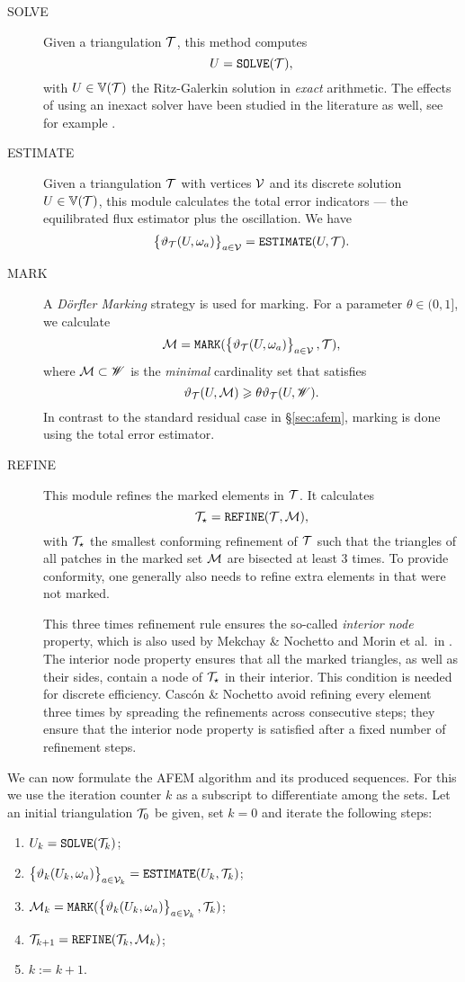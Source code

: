 \documentclass[thesis.tex]{subfiles}
\begin{document}
\begin{description}
  \item[SOLVE]
Given a triangulation $\mathcal{T}$, this method computes
\[
  U = \texttt{SOLVE}(\mathcal{T}),
\]
with $U \in \mathbb{V}(\mathcal{T})$ the  Ritz-Galerkin solution in \emph{exact} arithmetic. The effects of using an inexact solver have
been studied in the literature as well, see for example \cite{carstensen2014axioms}.
\item[ESTIMATE]
  Given a triangulation $\mathcal{T}$ with vertices $\mathcal{V}$ and its discrete solution $U \in \mathbb{V}(\mathcal{T})$, this module 
calculates the total error indicators --- the equilibrated flux estimator plus the oscillation. We have
\[
  \set{\vartheta_{\mathcal{T}}(U, \omega_a)}_{a \in \mathcal{V}} = \texttt{ESTIMATE}(U, \mathcal{T}).
\]
\item[MARK]
A \emph{D\"orfler Marking} strategy \cite{dorfler1996convergent} is used for marking. For a parameter $\theta \in (0,1]$, we calculate
\[
  \mathcal{M} = \texttt{MARK}( \set{\vartheta_{\mathcal{T}}(U, \omega_a)}_{a \in \mathcal{V}}, \mathcal{T}),
\]
where $\mathcal{M} \subset \mathscr{W}$ is the \emph{minimal} cardinality set that satisfies
\[
  \vartheta_{\mathcal{T}}(U,\mathcal{M}) \geqslant \theta \vartheta_{\mathcal{T}}(U, \mathscr{W}).
\]
In contrast to the standard residual case in \S\ref{sec:afem}, marking is done using the total error estimator.
\item[REFINE]
This module refines the marked elements in $\mathcal{T}$. It calculates
\[
  \mathcal{T}_\star = \texttt{REFINE}(\mathcal{T}, \mathcal{M}),
\]
with $\mathcal{T}_\star$ the smallest conforming refinement of $\mathcal{T}$ such that the triangles of
all patches in the marked set $\mathcal{M}$ are bisected at least 3 times. 
To provide conformity, one generally also needs to refine extra elements in that were not marked.

This three times refinement rule ensures the so-called \emph{interior node} property,
which is also used by Mekchay \& Nochetto \cite{mekchay2005convergence} and Morin et al.~in \cite{morin2002convergence}.
The interior node property ensures that all the marked triangles, as well as their sides, contain a node of $\mathcal{T}_\star$ in their interior.
This condition is needed for  discrete efficiency. Casc\'on \& Nochetto \cite{cascon2012} avoid
refining every element three times by  spreading the refinements across consecutive steps;
they ensure that the interior node property is satisfied after a fixed number of refinement steps.
\end{description}

We can now formulate the AFEM algorithm and its produced sequences. For this we use the
iteration counter $k$ as a subscript to differentiate among the sets.
Let an initial triangulation $\mathcal{T}_0$ be given, set $k = 0$ and iterate the following steps:
\begin{enumerate}
\item $U_k = \texttt{SOLVE}(\mathcal{T}_k)$;
\item $\set{\vartheta_k(U_k, \omega_a)}_{a \in \mathcal{V}_k} = \texttt{ESTIMATE}(U_k, \mathcal{T}_k)$;
  \item $\mathcal{M}_k = \texttt{MARK}(\set{\vartheta_k(U_k, \omega_a)}_{a \in \mathcal{V}_k}, \mathcal{T}_k)$;
  \item $\mathcal{T}_{k+1} = \texttt{REFINE}(\mathcal{T}_k, \mathcal{M}_k)$;
  \item $k  := k + 1$.
\end{enumerate}
\end{document}
